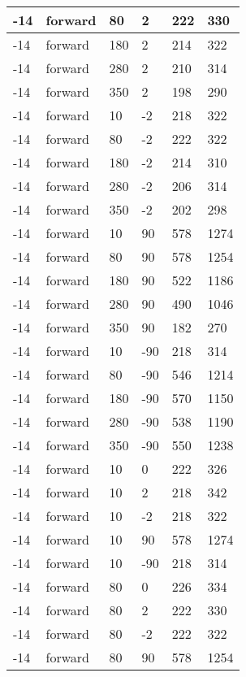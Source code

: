 \begin{longtable}{|l|l|l|l|l|l|}
			\hline
			-14 & forward & 80 & 2 & 222 & 330 \\
			\hline
			-14 & forward & 180 & 2 & 214 & 322 \\
			\hline
			-14 & forward & 280 & 2 & 210 & 314 \\
			\hline
			-14 & forward & 350 & 2 & 198 & 290 \\
			\hline
			-14 & forward & 10 & -2 & 218 & 322 \\
			\hline
			-14 & forward & 80 & -2 & 222 & 322 \\
			\hline
			-14 & forward & 180 & -2 & 214 & 310 \\
			\hline
			-14 & forward & 280 & -2 & 206 & 314 \\
			\hline
			-14 & forward & 350 & -2 & 202 & 298 \\
			\hline
			-14 & forward & 10 & 90 & 578 & 1274 \\
			\hline
			-14 & forward & 80 & 90 & 578 & 1254 \\
			\hline
			-14 & forward & 180 & 90 & 522 & 1186 \\
			\hline
			-14 & forward & 280 & 90 & 490 & 1046 \\
			\hline
			-14 & forward & 350 & 90 & 182 & 270 \\
			\hline
			-14 & forward & 10 & -90 & 218 & 314 \\
			\hline
			-14 & forward & 80 & -90 & 546 & 1214 \\
			\hline
			-14 & forward & 180 & -90 & 570 & 1150 \\
			\hline
			-14 & forward & 280 & -90 & 538 & 1190 \\
			\hline
			-14 & forward & 350 & -90 & 550 & 1238 \\
			\hline
			-14 & forward & 10 & 0 & 222 & 326 \\
			\hline
			-14 & forward & 10 & 2 & 218 & 342 \\
			\hline
			-14 & forward & 10 & -2 & 218 & 322 \\
			\hline
			-14 & forward & 10 & 90 & 578 & 1274 \\
			\hline
			-14 & forward & 10 & -90 & 218 & 314 \\
			\hline
			-14 & forward & 80 & 0 & 226 & 334 \\
			\hline
			-14 & forward & 80 & 2 & 222 & 330 \\
			\hline
			-14 & forward & 80 & -2 & 222 & 322 \\
			\hline
			-14 & forward & 80 & 90 & 578 & 1254 \\
			\hline

\end{longtable}
